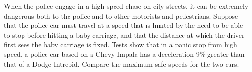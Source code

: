 When the police engage in a high-speed chase on city streets, it can be extremely
dangerous both to the police and to other motorists and pedestrians.
Suppose that the police car must travel at a speed that is limited by
the need to be able to stop before hitting a baby carriage, and that
the distance at which the driver first sees the baby carriage is
fixed. Tests show that in a panic stop from high speed,
a police car based on a Chevy Impala has a deceleration 9\%
greater than that of a Dodge Intrepid. Compare the maximum safe
speeds for the two cars.\answercheck
